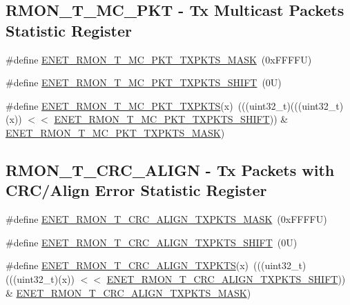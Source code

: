 \subsection*{R\+M\+O\+N\+\_\+\+T\+\_\+\+M\+C\+\_\+\+P\+KT -\/ Tx Multicast Packets Statistic Register}
\begin{DoxyCompactItemize}
\item 
\#define \mbox{\hyperlink{group___e_n_e_t___register___masks_gaf3856023c28aa2585937b9b2e3e46fcd}{E\+N\+E\+T\+\_\+\+R\+M\+O\+N\+\_\+\+T\+\_\+\+M\+C\+\_\+\+P\+K\+T\+\_\+\+T\+X\+P\+K\+T\+S\+\_\+\+M\+A\+SK}}~(0x\+F\+F\+F\+F\+U)
\item 
\#define \mbox{\hyperlink{group___e_n_e_t___register___masks_ga5b480910d2725a8c75b23a0327898400}{E\+N\+E\+T\+\_\+\+R\+M\+O\+N\+\_\+\+T\+\_\+\+M\+C\+\_\+\+P\+K\+T\+\_\+\+T\+X\+P\+K\+T\+S\+\_\+\+S\+H\+I\+FT}}~(0\+U)
\item 
\#define \mbox{\hyperlink{group___e_n_e_t___register___masks_gacb7fa6647506149367368bd1abcdc94e}{E\+N\+E\+T\+\_\+\+R\+M\+O\+N\+\_\+\+T\+\_\+\+M\+C\+\_\+\+P\+K\+T\+\_\+\+T\+X\+P\+K\+TS}}(x)~(((uint32\+\_\+t)(((uint32\+\_\+t)(x)) $<$$<$ \mbox{\hyperlink{group___e_n_e_t___register___masks_ga5b480910d2725a8c75b23a0327898400}{E\+N\+E\+T\+\_\+\+R\+M\+O\+N\+\_\+\+T\+\_\+\+M\+C\+\_\+\+P\+K\+T\+\_\+\+T\+X\+P\+K\+T\+S\+\_\+\+S\+H\+I\+FT}})) \& \mbox{\hyperlink{group___e_n_e_t___register___masks_gaf3856023c28aa2585937b9b2e3e46fcd}{E\+N\+E\+T\+\_\+\+R\+M\+O\+N\+\_\+\+T\+\_\+\+M\+C\+\_\+\+P\+K\+T\+\_\+\+T\+X\+P\+K\+T\+S\+\_\+\+M\+A\+SK}})
\end{DoxyCompactItemize}
\subsection*{R\+M\+O\+N\+\_\+\+T\+\_\+\+C\+R\+C\+\_\+\+A\+L\+I\+GN -\/ Tx Packets with C\+R\+C/\+Align Error Statistic Register}
\begin{DoxyCompactItemize}
\item 
\#define \mbox{\hyperlink{group___e_n_e_t___register___masks_gacccd1e251e3c6aa0159af65a0aee2772}{E\+N\+E\+T\+\_\+\+R\+M\+O\+N\+\_\+\+T\+\_\+\+C\+R\+C\+\_\+\+A\+L\+I\+G\+N\+\_\+\+T\+X\+P\+K\+T\+S\+\_\+\+M\+A\+SK}}~(0x\+F\+F\+F\+F\+U)
\item 
\#define \mbox{\hyperlink{group___e_n_e_t___register___masks_ga2736c6ffc11baa5ce09a120c967841e1}{E\+N\+E\+T\+\_\+\+R\+M\+O\+N\+\_\+\+T\+\_\+\+C\+R\+C\+\_\+\+A\+L\+I\+G\+N\+\_\+\+T\+X\+P\+K\+T\+S\+\_\+\+S\+H\+I\+FT}}~(0\+U)
\item 
\#define \mbox{\hyperlink{group___e_n_e_t___register___masks_ga46c296756912f29ddce9f6c181f6790d}{E\+N\+E\+T\+\_\+\+R\+M\+O\+N\+\_\+\+T\+\_\+\+C\+R\+C\+\_\+\+A\+L\+I\+G\+N\+\_\+\+T\+X\+P\+K\+TS}}(x)~(((uint32\+\_\+t)(((uint32\+\_\+t)(x)) $<$$<$ \mbox{\hyperlink{group___e_n_e_t___register___masks_ga2736c6ffc11baa5ce09a120c967841e1}{E\+N\+E\+T\+\_\+\+R\+M\+O\+N\+\_\+\+T\+\_\+\+C\+R\+C\+\_\+\+A\+L\+I\+G\+N\+\_\+\+T\+X\+P\+K\+T\+S\+\_\+\+S\+H\+I\+FT}})) \& \mbox{\hyperlink{group___e_n_e_t___register___masks_gacccd1e251e3c6aa0159af65a0aee2772}{E\+N\+E\+T\+\_\+\+R\+M\+O\+N\+\_\+\+T\+\_\+\+C\+R\+C\+\_\+\+A\+L\+I\+G\+N\+\_\+\+T\+X\+P\+K\+T\+S\+\_\+\+M\+A\+SK}})
\end{DoxyCompactItemize}
